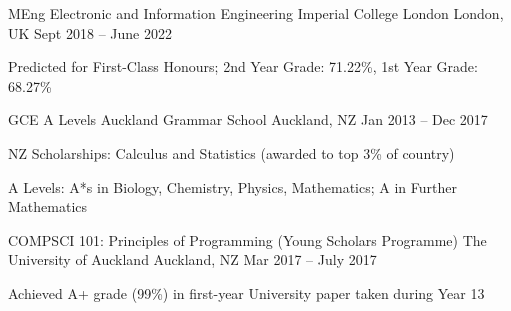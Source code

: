 

\begin{cventries}

  \cventry
    {MEng Electronic and Information Engineering}
    {Imperial College London}
    {London, UK}
    {Sept 2018 -- June 2022}
    {
      \begin{cvitems}
        \item {Predicted for First-Class Honours; 2nd Year Grade: 71.22\%, 1st Year Grade: 68.27\%}
      \end{cvitems}
    }

  \cventry
    {GCE A Levels}
    {Auckland Grammar School}
    {Auckland, NZ}
    {Jan 2013 -- Dec 2017}
    {
      \begin{cvitems}
        \item NZ Scholarships: Calculus and Statistics (awarded to top 3\% of country)
        \item A Levels: A*s in Biology, Chemistry, Physics, Mathematics; A in Further Mathematics
      \end{cvitems}
    }

    \cventry
    {COMPSCI 101: Principles of Programming (Young Scholars Programme)}
    {The University of Auckland}
    {Auckland, NZ}
    {Mar 2017 -- July 2017}
    {
      \begin{cvitems}
        \item {Achieved A+ grade (99\%) in first-year University paper taken during Year 13}
      \end{cvitems}
    }

\end{cventries}
